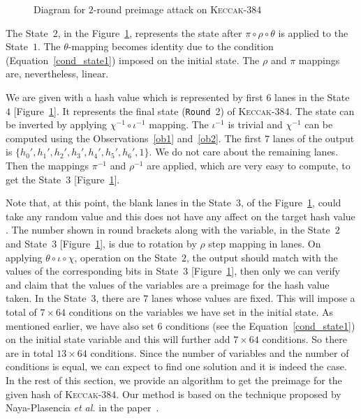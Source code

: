 \documentclass[runningheads]{llncs}
\newcommand{\KECCAK}{\mbox{\textsc{Keccak}}}
\newcommand{\Keccak}{\mbox{\textsc{Keccak}}}
\newcommand{\etal}{\textit{et al. }}
\begin{document}
\begin{figure}[!t]
\begin{center}
{
}
\caption{Diagram for $2$-round preimage attack on \Keccak-$384$ \label{atk}}
\end{center}
\end{figure}
The State~$2$, in the Figure~\ref{atk}, represents the state after $\pi \circ \rho \circ \theta$ is applied to the State~$1$. 
The $\theta$-mapping becomes identity due to the condition
(Equation~\ref{cond_state1}) imposed on the initial state. 
The $\rho$ and $\pi$ mappings are, nevertheless, linear.

We are given with a hash value which is represented by first $6$ lanes in the State~$4$ [Figure~\ref{atk}]. It represents the final state ({\tt Round}~2) of \Keccak-$384$. The state can be inverted by applying $\chi^{-1} \circ \iota^{-1}$ mapping. The $\iota^{-1}$ is trivial and $\chi^{-1}$ can be computed using the Observations~\ref{ob1} and~\ref{ob2}. The first $7$ lanes of the output is $\{h_0',h_1',h_2',h_3',h_4',h_5',h_6',1\}$. We do not care about the remaining  lanes. 
Then the mappings $\pi^{-1}$ and $\rho^{-1}$ are applied, which are very easy to compute, to get the State~$3$ [Figure~\ref{atk}]. 

Note that, at this point, the blank lanes in the State~$3$, of the Figure~\ref{atk}, could take any random value and this does not have any affect on the target hash value
.
The number shown in round brackets along with the variable, in the State~$2$ and State~$3$ [Figure~\ref{atk}], is due to rotation by $\rho$ step mapping in lanes.
On applying $\theta \circ \iota \circ \chi$, operation on the State~$2$, the output should match with the values of the corresponding bits in State~$3$ [Figure~\ref{atk}], then only we can verify and claim that the values of the variables are a preimage for the hash value taken. In the State~$3$, there are $7$ lanes whose values are fixed. 
This will impose a total of $7\times 64$ conditions on the variables we have set in the initial state. As mentioned earlier, we have also set $6$ conditions (see the Equation~\ref{cond_state1}) on the initial state variable and this will further add $7 \times 64$ conditions. So there are in total $13\times 64$ conditions. Since the number of variables and the number of conditions is equal, we can expect to find one solution and it is indeed the case. In the rest of this section, we provide an algorithm to get the preimage for the given hash of \KECCAK-$384$. Our method is based on the technique proposed by Naya-Plasencia \etal in the paper~\cite{naya2011practical}.
\end{document}
